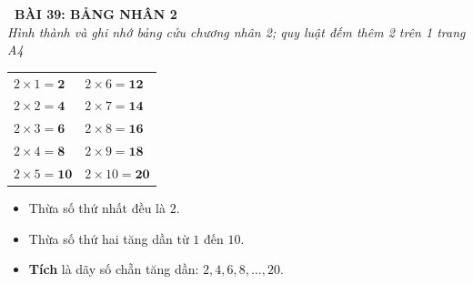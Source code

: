 \documentclass[11pt,a4paper]{article}
\begin{document}
\begin{tcolorbox}[
  enhanced,
  colback=violet!8!white,
  colframe=violet!70!black,
  arc=3mm, boxrule=1.2pt,
  left=3mm, right=3mm, top=2mm, bottom=2mm,
  halign=center
]
  {\LARGE\bfseries\color{violet!90!black}\faBookmark\ BÀI 39: BẢNG NHÂN 2}\\[1mm]
  {\itshape\footnotesize\color{black!75} Hình thành và ghi nhớ bảng cửu chương nhân 2; quy luật đếm thêm 2 trên 1 trang A4}
\end{tcolorbox}

\vspace{-2mm}

\noindent
\begin{minipage}[t]{0.49\textwidth}\vspace{0pt}
\begin{tcolorbox}[
  enhanced,
  colback=violet!4!white,
  colframe=violet!75!black,
  arc=2mm, boxrule=0.8pt,
  left=2mm, right=2mm, top=1.8mm, bottom=1.8mm,
  title={\footnotesize\bfseries\color{white}\faKey\ 1. Bảng nhân 2 chuẩn mực}
]
{\footnotesize
\begin{tabular}{l@{\quad}l}
  $2 \times 1 = \mathbf{2}$ & $2 \times 6 = \mathbf{12}$ \\
  $2 \times 2 = \mathbf{4}$ & $2 \times 7 = \mathbf{14}$ \\
  $2 \times 3 = \mathbf{6}$ & $2 \times 8 = \mathbf{16}$ \\
  $2 \times 4 = \mathbf{8}$ & $2 \times 9 = \mathbf{18}$ \\
  $2 \times 5 = \mathbf{10}$ & $2 \times 10 = \mathbf{20}$
\end{tabular}
\vspace{1mm}
\begin{itemize}\setlength{\itemsep}{0.5pt}\setlength{\leftskip}{-2.5mm}
  \item Thừa số thứ nhất đều là $2$.
  \item Thừa số thứ hai tăng dần từ $1$ đến $10$.
  \item \textbf{Tích} là dãy số chẵn tăng dần: $2, 4, 6, 8, \dots, 20$.
\end{itemize}
}
\end{tcolorbox}
\end{minipage}
\hfill
\end{document}
